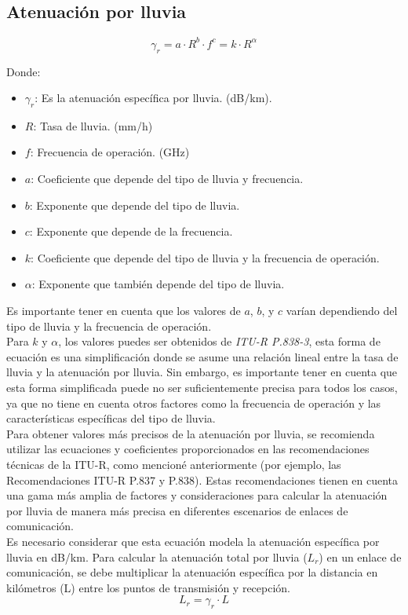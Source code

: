 \documentclass[
	12pt, %
	fleqn, %
	a4paper, %
	oneside, %
]{LegrandOrangeBook}
\begin{document}
\subsection{Atenuación por lluvia}
\begin{equation}
\gamma_r = a \cdot R^b \cdot f^c=k\cdot R^\alpha
\end{equation}

Donde:
\begin{itemize}
\item $\gamma_r$: Es la atenuación específica por lluvia. (dB/km).
\item $R$: Tasa de lluvia. (mm/h)
\item $f$: Frecuencia de operación. (GHz)
\item $a$: Coeficiente que depende del tipo de lluvia y frecuencia.
\item $b$: Exponente que depende del tipo de lluvia.
\item $c$: Exponente que depende de la frecuencia.
\item $k$: Coeficiente que depende del tipo de lluvia y la frecuencia de operación.
\item $\alpha$: Exponente que también depende del tipo de lluvia.
\end{itemize}
Es importante tener en cuenta que los valores de $a$, $b$, y $c$ varían dependiendo del tipo de lluvia y la frecuencia de operación.\\
Para $k$ y $\alpha$, los valores puedes ser obtenidos de \textit{ITU-R P.838-3}, esta forma de ecuación es una simplificación donde se asume una relación lineal entre la tasa de lluvia y la atenuación por lluvia. Sin embargo, es importante tener en cuenta que esta forma simplificada puede no ser suficientemente precisa para todos los casos, ya que no tiene en cuenta otros factores como la frecuencia de operación y las características específicas del tipo de lluvia.\\
Para obtener valores más precisos de la atenuación por lluvia, se recomienda utilizar las ecuaciones y coeficientes proporcionados en las recomendaciones técnicas de la ITU-R, como mencioné anteriormente (por ejemplo, las Recomendaciones ITU-R P.837 y P.838). Estas recomendaciones tienen en cuenta una gama más amplia de factores y consideraciones para calcular la atenuación por lluvia de manera más precisa en diferentes escenarios de enlaces de comunicación.\\
Es necesario considerar que esta ecuación modela la atenuación específica por lluvia en dB/km. Para calcular la atenuación total por lluvia ($L_r$) en un enlace de comunicación, se debe multiplicar la atenuación específica por la distancia en kilómetros (L) entre los puntos de transmisión y recepción.
\begin{equation}
L_r=\gamma_r\cdot L
\end{equation}
\end{document}
